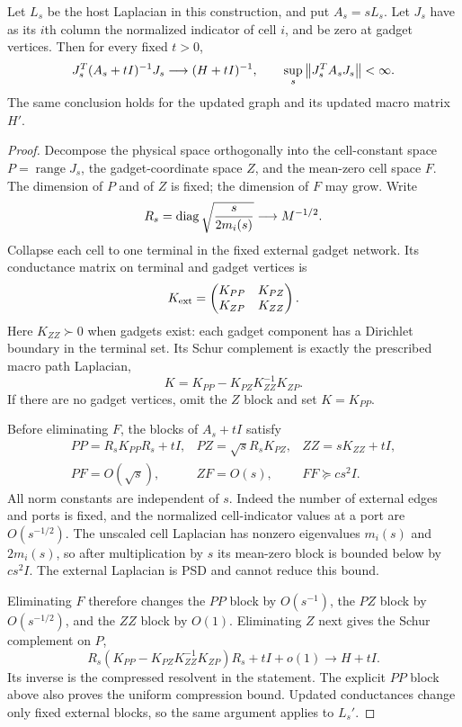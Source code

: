 \begin{lemma}\label{u:lem:resolvent}
Let $L_s$ be the host Laplacian in this construction, and put
$A_s=sL_s$. Let $J_s$ have as its $i$th column the normalized indicator
of cell $i$, and be zero at gadget vertices. Then for every fixed $t>0$,
\[
 J_s^T(A_s+tI)^{-1}J_s\longrightarrow(H+tI)^{-1},
 \qquad \sup_s\left\lVert J_s^TA_sJ_s\right\rVert<\infty.
\]
The same conclusion holds for the updated graph and its updated
macro matrix $H'$.
\end{lemma}
\begin{proof}
Decompose the physical space orthogonally into the cell-constant
space $P=\operatorname{range}J_s$, the gadget-coordinate space $Z$,
and the mean-zero cell space $F$. The dimension of $P$ and of $Z$
is fixed; the dimension of $F$ may grow. Write
\[
 R_s=\operatorname{diag}\sqrt{\frac{s}{2m_i(s)}}\longrightarrow M^{-1/2}.
\]
Collapse each cell to one terminal in the fixed external gadget
network. Its conductance matrix on terminal and gadget vertices is
\[
 K_{\rm ext}=\begin{pmatrix}K_{PP}&K_{PZ}\\K_{ZP}&K_{ZZ}\end{pmatrix}.
\]
Here $K_{ZZ}\succ0$ when gadgets exist: each gadget component has a
Dirichlet boundary in the terminal set. Its Schur complement is exactly
the prescribed macro path Laplacian,
\[
 K=K_{PP}-K_{PZ}K_{ZZ}^{-1}K_{ZP}.
\]
If there are no gadget vertices, omit the $Z$ block and set $K=K_{PP}$.

Before eliminating $F$, the blocks of $A_s+tI$ satisfy
\[
 \begin{array}{lll}
 PP=R_sK_{PP}R_s+tI,&
 PZ=\sqrt{s}R_sK_{PZ},& ZZ=sK_{ZZ}+tI,\\
 PF=O(\sqrt{s}),& ZF=O(s),& FF\succeq c s^2 I.
 \end{array}
\]
All norm constants are independent of $s$. Indeed the number of
external edges and ports is fixed, and the normalized cell-indicator
values at a port are $O(s^{-1/2})$. The unscaled cell Laplacian has
nonzero eigenvalues $m_i(s)$ and $2m_i(s)$, so after multiplication
by $s$ its mean-zero block is bounded below by $c s^2I$.
The external Laplacian is PSD and cannot reduce this bound.

Eliminating $F$ therefore changes the $PP$ block by $O(s^{-1})$,
the $PZ$ block by $O(s^{-1/2})$, and the $ZZ$ block by $O(1)$.
Eliminating $Z$ next gives the Schur complement on $P$,
\[
 R_s(K_{PP}-K_{PZ}K_{ZZ}^{-1}K_{ZP})R_s+tI+o(1)
       \longrightarrow H+tI.
\]
Its inverse is the compressed resolvent in the statement.
The explicit $PP$ block above also proves the uniform compression
bound. Updated conductances change only fixed external blocks, so
the same argument applies to $L_s'$.
\end{proof}

